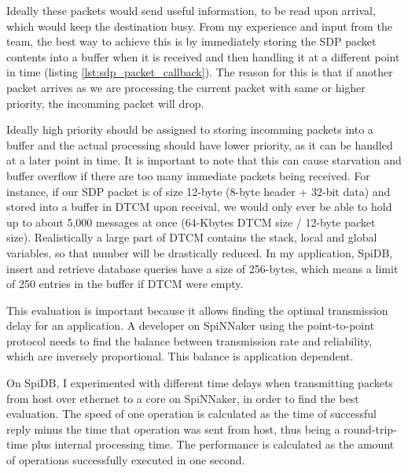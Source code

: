 Ideally these packets would send useful information, to be read upon arrival, which would keep the destination busy. From my experience and input from the team, the best way to achieve this is by immediately storing the SDP packet contents into a buffer when it is received and then handling it at a different point in time (listing \ref{lst:sdp_packet_callback}). The reason for this is that if another packet arrives as we are processing the current packet with same or higher priority, the incomming packet will drop.

Ideally high priority should be assigned to storing incomming packets into a buffer and the actual processing should have lower priority, as it can be handled at a later point in time. It is important to note that this can cause starvation and buffer overflow if there are too many immediate packets being received. For instance, if our SDP packet is of size 12-byte (8-byte header + 32-bit data) and stored into a buffer in DTCM upon receival, we would only ever be able to hold up to about 5,000 messages at once (64-Kbytes DTCM size / 12-byte packet size). Realistically a large part of DTCM contains the stack, local and global variables, so that number will be drastically reduced. In my application, SpiDB, insert and retrieve database queries have a size of 256-bytes, which means a limit of 250 entries in the buffer if DTCM were empty.

This evaluation is important because it allows finding the optimal transmission delay for an application. A developer on SpiNNaker using the point-to-point protocol needs to find the balance between transmission rate and reliability, which are inversely proportional. This balance is application dependent.



On SpiDB, I experimented with different time delays when transmitting packets from host over ethernet to a core on SpiNNaker, in order to find the best evaluation. The speed of one operation is calculated as the time of successful reply minus the time that operation was sent from host, thus being a round-trip-time plus internal processing time. The performance is calculated as the amount of operations successfully executed in one second.


